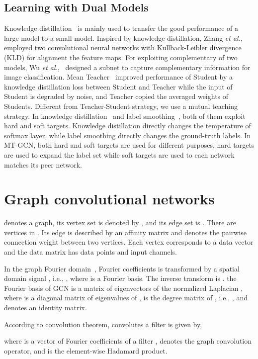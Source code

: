 \documentclass{article}
\begin{document}
\subsection{Learning with Dual Models}
Knowledge distillation~\cite{hinton2015distilling} is mainly used to transfer the good performance of a large model to a small model. Inspired by knowledge distillation, Zhang {\it et al.},~\cite{zhang2018deep} employed two convolutional neural networks with Kullback-Leibler divergence (KLD) for alignment the feature maps. For exploiting complementary of two models, Wu {\it et al.},~\cite{wu2019mutual} designed a subnet to capture complementary information for image classification. Mean Teacher~\cite{tarvainen2017mean} improved performance of Student by a knowledge distillation loss between Student and Teacher while the input of Student is degraded by noise, and Teacher copied the averaged weights of Students. Different from Teacher-Student strategy, we use a mutual teaching strategy. In knowledge distillation~\cite{hinton2015distilling} and label smoothing~\cite{muller2019does}, both of them exploit hard and soft targets. Knowledge distillation directly changes the temperature of softmax layer, while label smoothing directly changes the ground-truth labels. In MT-GCN, both hard and soft targets are used for different purposes, hard targets are used to expand the label set while soft targets are used to each network matches its peer network.
\section{Graph convolutional networks}\label{Preliminaries}
 denotes a graph, its vertex set is denoted by , and its edge set is . There are  vertices in . Its edge is described by an affinity matrix  and  denotes the pairwise connection weight between two vertices. Each vertex corresponds to a data vector  and the data matrix  has  data points and  input channels.

In the graph Fourier domain~\cite{shuman2013emerging}, Fourier coefficients  is transformed by a spatial domain signal , i.e., , where  is a Fourier basis. The inverse transform is . the Fourier basis of GCN is a matrix of eigenvectors of the normalized Laplacian , where  is a diagonal matrix of eigenvalues of ,  is the degree matrix of , i.e., , and  denotes an identity matrix.

According to convolution theorem,  convolutes a filter  is given by,

where  is a vector of Fourier coefficients of a filter ,  denotes the graph convolution operator, and  is the element-wise Hadamard product.
\end{document}
